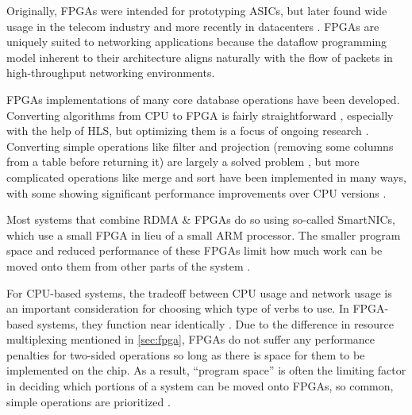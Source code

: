 Originally, FPGAs were intended for prototyping ASICs, but later found wide
usage in the telecom industry \autocite{bobda-trets-2022,mencer-queue-2020} and
more recently in datacenters \autocite{mencer-queue-2020,hoozemans-cas-2021}.
FPGAs are uniquely suited to networking applications because the dataflow
programming model \autocite{hoozemans-cas-2021} inherent to their architecture
aligns naturally with the flow of packets in high-throughput networking
environments.

FPGAs implementations of many core database operations have been developed.
Converting algorithms from CPU to FPGA is fairly straightforward
\autocite{fang-vldb-2020}, especially with the help of HLS, but optimizing them
is a focus of ongoing research \autocite{fang-vldb-2020}. Converting simple
operations like filter and projection (removing some columns from a table before
returning it) are largely a solved problem \autocite{fang-vldb-2020}, but more
complicated operations like merge and sort have been implemented in many ways,
with some showing significant performance improvements over CPU versions
\autocite{leggett-trets-2025,moghaddamfar-damon-2021}.


\label{sec:rdma-fpga}

Most systems that combine RDMA \& FPGAs do so using so-called SmartNICs, which
use a small FPGA in lieu of a small ARM processor. The smaller program space and
reduced performance of these FPGAs limit how much work can be moved onto them
from other parts of the system \autocite{honeycomb}.

For CPU-based systems, the tradeoff between CPU usage and network usage is an
important consideration for choosing which type of verbs to use. In FPGA-based
systems, they function near identically \autocite{strom}. Due to the difference
in resource multiplexing mentioned in \autoref{sec:fpga}, FPGAs do not suffer
any performance penalties for two-sided operations so long as there is space for
them to be implemented on the chip. As a result, ``program space'' is often the
limiting factor in deciding which portions of a system can be moved onto FPGAs,
so common, simple operations are prioritized
\autocite{honeycomb,moghaddamfar-damon-2021}.
